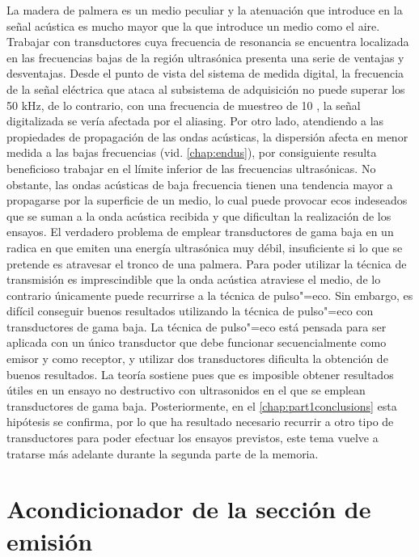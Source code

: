 La madera de palmera es un medio peculiar y la atenuación que introduce en
la señal acústica es mucho mayor que la que introduce un medio como el
aire. Trabajar con transductores cuya frecuencia de resonancia se encuentra
localizada en las frecuencias bajas de la región ultrasónica presenta una
serie de ventajas y desventajas. Desde el punto de vista del sistema de
medida digital, la frecuencia de la señal eléctrica que ataca al subsistema
de adquisición no puede superar los 50 kHz, de lo contrario, con una
frecuencia de muestreo de 10 \kms{}, la señal digitalizada se vería
afectada por el aliasing. Por otro lado, atendiendo a las propiedades de
propagación de las ondas acústicas, la dispersión afecta en menor medida a
las bajas frecuencias (vid. \cref{chap:endus}), por consiguiente resulta
beneficioso trabajar en el límite inferior de las frecuencias ultrasónicas.
No obstante, las ondas acústicas de baja frecuencia tienen una tendencia
mayor a propagarse por la superficie de un medio, lo cual puede provocar
ecos indeseados que se suman a la onda acústica recibida y que dificultan
la realización de los ensayos. El verdadero problema de emplear
transductores de gama baja en un  radica en que emiten una
energía ultrasónica muy débil, insuficiente si lo que se pretende es
atravesar el tronco de una palmera. Para poder utilizar la técnica de
transmisión es imprescindible que la onda acústica atraviese el medio, de
lo contrario únicamente puede recurrirse a la técnica de pulso"=eco. Sin
embargo, es difícil conseguir buenos resultados utilizando la técnica de
pulso"=eco con transductores de gama baja. La técnica de pulso"=eco está
pensada para ser aplicada con un único transductor que debe funcionar
secuencialmente como emisor y como receptor, y utilizar dos transductores
dificulta la obtención de buenos resultados. La teoría sostiene pues que es
imposible obtener resultados útiles en un ensayo no destructivo con
ultrasonidos en el que se emplean transductores de gama baja.
Posteriormente, en el \cref{chap:part1conclusions} esta hipótesis se
confirma, por lo que ha resultado necesario recurrir a otro tipo de
transductores para poder efectuar los ensayos previstos, este tema vuelve a
tratarse más adelante durante la segunda parte de la memoria.


\section{Acondicionador de la sección de emisión}

